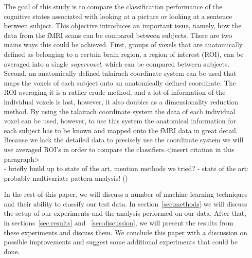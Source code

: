 \documentclass[preprint,journal,11pt]{vgtc}
\begin{document}
\indent	The goal of this study is to compare the classification performance of the cognitive states associated with looking at a picture or looking at a sentence between subject. This objective introduces an important issue, namely, how the data from the fMRI scans can be compared between subjects. There are two mains ways this could be achieved. First, groups of voxels that are anatomically defined as belonging to a certain brain region, a region of interest (ROI), can be averaged into a single \emph{supervoxel}, which can be compared between subjects. Second, an anatomically defined talairach coordinate system can be used that maps the voxels of each subject onto an anatomically defined coordinate. The ROI averaging it is a rather crude method, and a lot of information of the individual voxels is lost, however, it also doubles as a dimensionality reduction method. By using the talairach coordinate system the data of each individual voxel can be used, however, to use this system the anatomical information for each subject has to be known and mapped onto the fMRI data in great detail. Because we lack the detailed data to precisely use the coordinate system we will use averaged ROI's in order to compare the classifiers.<insert citation in this paragraph> \\



- briefly build up to state of the art, mention methods we tried?
- state of the art: probably multivariate pattern analysis! (\cite{Haxby2012852})

In the rest of this paper, we will discuss a number of machine learning techniques and their ability to classify our test data. In section~\ref{sec:methods} we will discuss the setup of our experiments and the analysis performed on our data. After that, in sections~\ref{sec:results} and ~\ref{sec:discussion}, we will present the results from these experiments and discuss them. We conclude this paper with a discussion on possible improvements and suggest some additional experiments that could be done.
\end{document}
